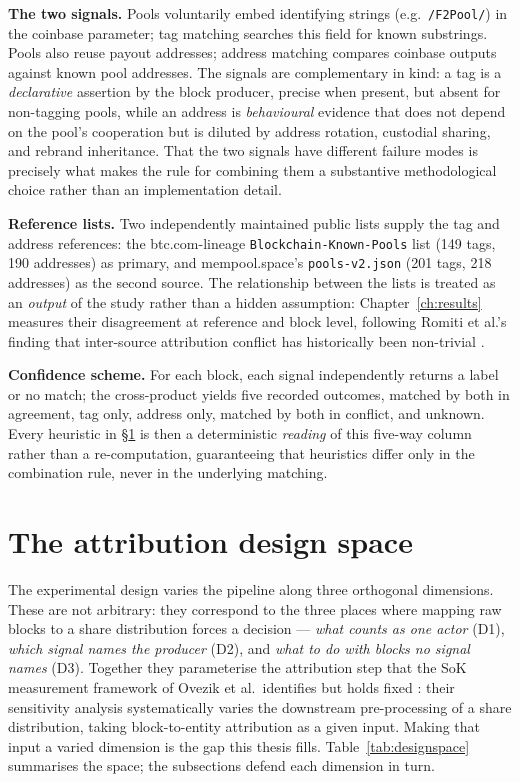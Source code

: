 \documentclass[logo,msc]{infthesis}           %
\begin{document}
\textbf{The two signals.} Pools voluntarily embed identifying strings (e.g.\
\texttt{/F2Pool/}) in the coinbase parameter; tag matching searches this field
for known substrings. Pools also reuse payout addresses; address matching
compares coinbase outputs against known pool addresses. The signals are
complementary in kind: a tag is a \emph{declarative} assertion by the block
producer, precise when present, but absent for non-tagging pools, while
an address is \emph{behavioural} evidence that does not depend on the pool's
cooperation but is diluted by address rotation, custodial sharing, and
rebrand inheritance. That the two signals have different failure modes is
precisely what makes the rule for combining them a substantive methodological
choice rather than an implementation detail.
 
\textbf{Reference lists.} Two independently maintained public lists supply the
tag and address references: the btc.com-lineage \texttt{Blockchain-Known-Pools}
list (149 tags, 190 addresses) as primary, and mempool.space's
\texttt{pools-v2.json} (201 tags, 218 addresses) as the second source. The
relationship between the lists is treated as an \emph{output} of the study
rather than a hidden assumption: Chapter~\ref{ch:results} measures their
disagreement at reference and block level, following Romiti et al.'s finding
that inter-source attribution conflict has historically been non-trivial
\cite{romiti2019deep}.
 
\textbf{Confidence scheme.} For each block, each signal independently returns
a label or no match; the cross-product yields five recorded outcomes,
matched by both in agreement, tag only, address only, matched by both in
conflict, and unknown. Every heuristic in \S\ref{sec:designspace} is then a
deterministic \emph{reading} of this five-way column rather than a
re-computation, guaranteeing that heuristics differ only in the combination
rule, never in the underlying matching.
 
\section{The attribution design space}
\label{sec:designspace}
 
The experimental design varies the pipeline along three orthogonal dimensions.
These are not arbitrary: they correspond to the three places where mapping raw
blocks to a share distribution forces a decision --- \emph{what counts as one
actor} (D1), \emph{which signal names the producer} (D2), and \emph{what to do
with blocks no signal names} (D3). Together they parameterise the attribution
step that the SoK measurement framework of Ovezik et al.\ identifies but holds
fixed \cite{ovezik2025sok}: their sensitivity analysis systematically varies
the downstream pre-processing of a share distribution, taking
block-to-entity attribution as a given input. Making that input a varied
dimension is the gap this thesis fills. Table~\ref{tab:designspace} summarises
the space; the subsections defend each dimension in turn.
 
\end{document}
